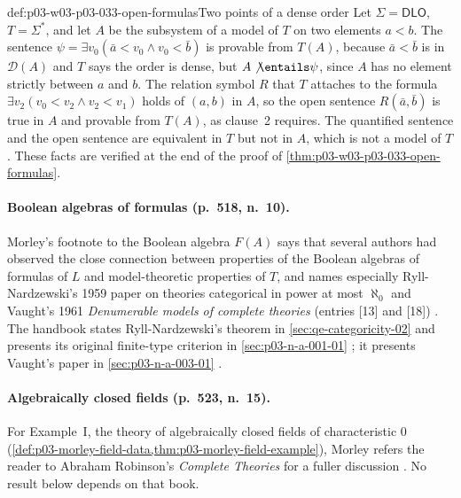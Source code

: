 \begin{hbexample}{def:p03-w03-p03-033-open-formulas}{Two points of a dense order}
Let \(\Sigma=\mathsf{DLO}\), \(T=\Sigma^*\), and let \(A\) be the
subsystem of a model of \(T\) on two elements \(a<b\). The sentence
\(\psi=\exists v_0(\bar a<v_0\wedge v_0<\bar b)\) is provable from
\(T(A)\), because \(\bar a<\bar b\) is in \(\mathscr D(A)\) and \(T\)
says the order is dense, but \(A\not\entails\psi\), since \(A\) has no
element strictly between \(a\) and \(b\). The relation symbol \(R\) that
\(T\) attaches to the formula \(\exists v_2(v_0<v_2\wedge v_2<v_1)\)
holds of \((a,b)\) in \(A\), so the open sentence \(R(\bar a,\bar b)\)
is true in \(A\) and provable from \(T(A)\), as clause~2 requires. The
quantified sentence and the open sentence are equivalent in \(T\) but not
in \(A\), which is not a model of \(T\). These facts are verified at the
end of the proof of \cref{thm:p03-w03-p03-033-open-formulas}.
\end{hbexample}

\paragraph{Boolean algebras of formulas (p.~518, n.~10).} Morley's
footnote to the Boolean algebra \(F(A)\) says that several authors had
observed the close connection between properties of the Boolean algebras
of formulas of \(L\) and model-theoretic properties of \(T\), and names
especially Ryll-Nardzewski's 1959 paper on theories categorical in power
at most \(\aleph_0\) and Vaught's 1961 \emph{Denumerable models of
complete theories} (entries [13] and [18]) \cite[p.~518, n.~10;
p.~538]{Morley1965}. The handbook states Ryll-Nardzewski's theorem in
\cref{sec:qe-categoricity-02} and presents its original finite-type
criterion in \cref{sec:p03-n-a-001-01} \cite{RyllNardzewski1959}; it presents
Vaught's paper in \cref{sec:p03-n-a-003-01} \cite{Vaught1961}.

\paragraph{Algebraically closed fields (p.~523, n.~15).} For Example~I,
the theory of algebraically closed fields of characteristic \(0\)
(\cref{def:p03-morley-field-data,thm:p03-morley-field-example}), Morley
refers the reader to Abraham Robinson's \emph{Complete Theories} for a
fuller discussion \cite[p.~523, n.~15]{Morley1965}
\cite{Robinson1956}. No result below depends on that book.

